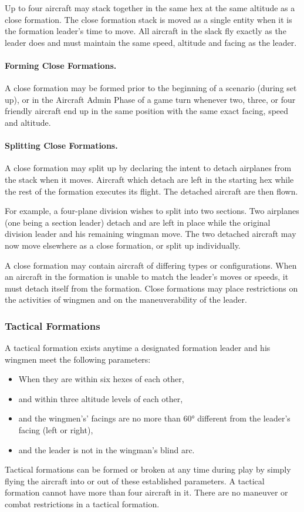 Up to four aircraft may stack together in the same hex at the same altitude as a close formation. The close formation stack is moved as a single entity when it is the formation leader's time to move. All aircraft in the slack fly exactly as the leader does and must maintain the same speed, altitude and facing as the leader.

\paragraph{Forming Close Formations.} A close formation may be formed prior to the beginning of a scenario (during set up), or in the Aircraft Admin Phase of a game turn whenever two, three, or four friendly aircraft end up in the same position with the same exact facing, speed and altitude.

\paragraph{Splitting Close Formations.} A close formation may split up by declaring the intent to detach airplanes from the stack when it moves. Aircraft which detach are left in the starting hex while the rest of the formation executes its flight. The detached aircraft are then flown.

For example, a four-plane division wishes to split into two sections. Two airplanes (one being a section leader) detach and are left in place while the original division leader and his remaining wingman move. The two detached aircraft may now move elsewhere as a close formation, or split up individually.

A close formation may contain aircraft of differing types or configurations. When an aircraft in the formation is unable to match the leader's moves or speeds, it must detach itself from the formation. Close formations may place restrictions on the activities of wingmen and on the maneuverability of the leader.

\subsubsection{Tactical Formations}

A tactical formation exists anytime a designated formation leader and his wingmen meet the following parameters:

\begin{itemize}
    \item When they are within six hexes of each other,
    \item and within three altitude levels of each other,
    \item and the wingmen’s' facings are no more than 60° different from the leader's facing (left or right),
    \item and the leader is not in the wingman's blind arc.
\end{itemize}

Tactical formations can be formed or broken at any time during play by simply flying the aircraft into or out of these established parameters. A tactical formation cannot have more than four aircraft in it. There are no maneuver or combat restrictions in a tactical formation.
